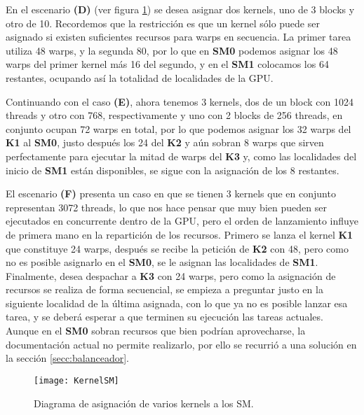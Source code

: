     En el escenario \textbf{(D)} (ver figura \ref{fig:KernelSM}) se desea asignar dos kernels, uno de 3 blocks y otro de 10. Recordemos que la restricción es que un kernel sólo puede ser asignado si existen suficientes recursos para warps en secuencia. La primer tarea utiliza 48 warps, y la segunda 80, por lo que en \textbf{SM0} podemos asignar los 48 warps del primer kernel más 16 del segundo, y en el \textbf{SM1} colocamos los 64 restantes, ocupando así la totalidad de localidades de la GPU.
    \newline
    
    Continuando con el caso \textbf{(E)}, ahora tenemos 3 kernels, dos de un block con 1024 threads y otro con 768, respectivamente y uno con 2 blocks de 256 threads, en conjunto ocupan 72 warps en total, por lo que podemos asignar los 32 warps del \textbf{K1} al \textbf{SM0}, justo después los 24 del \textbf{K2} y aún sobran 8 warps que sirven perfectamente para ejecutar la mitad de warps del \textbf{K3} y, como las localidades del inicio de \textbf{SM1} están disponibles, se sigue con la asignación de los 8 restantes.
    \newline
    
    El escenario \textbf{(F)} presenta un caso en que se tienen 3 kernels que en conjunto representan 3072 threads, lo que nos hace pensar que muy bien pueden ser ejecutados en concurrente dentro de la GPU, pero el orden de lanzamiento influye de primera mano en la repartición de los recursos. Primero se lanza el kernel \textbf{K1} que constituye 24 warps, después se recibe la petición de  \textbf{K2} con 48, pero como no es posible asignarlo en el \textbf{SM0}, se le asignan las localidades de \textbf{SM1}. Finalmente, desea despachar a \textbf{K3} con 24 warps, pero como la asignación de recursos se realiza de forma secuencial, se empieza a preguntar justo en la siguiente localidad de la última asignada, con lo que ya no es posible lanzar esa tarea, y se deberá esperar a que terminen su ejecución las tareas actuales. Aunque en el \textbf{SM0} sobran recursos que bien podrían aprovecharse, la documentación actual no permite realizarlo, por ello se recurrió a una solución en la sección \ref{secc:balanceador}.
    \newline
    
    \begin{figure}[ht]
      \centering
        \texttt{[image: KernelSM]}
        \caption{Diagrama de asignación de varios kernels a los SM.}
        \label{fig:KernelSM}
    \end{figure}


